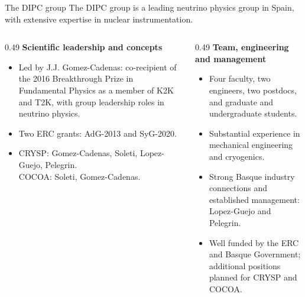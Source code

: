 \documentclass[aspectratio=169,11pt]{beamer}
\newcommand{\hi}[1]{\textcolor{crRed}{#1}}
\begin{document}


\begin{frame}{The DIPC group}
\small
The DIPC group is a leading neutrino physics group in Spain, with extensive expertise in \hi{nuclear instrumentation}.
\par\vspace{2mm}
\begin{columns}[T,onlytextwidth]
\begin{column}{0.49\textwidth}
\textbf{Scientific leadership and concepts}
\begin{itemize}
\item Led by \hi{J.J. Gomez-Cadenas}: co-recipient of the \hi{2016 Breakthrough Prize in Fundamental Physics} as a member of K2K and T2K, with group leadership roles in neutrino physics.
\item Two ERC grants: \hi{AdG-2013 and SyG-2020}.
\item \hi{CRYSP}: Gomez-Cadenas, Soleti, Lopez-Guejo, Pelegrin.\\
\hi{COCOA}: Soleti, Gomez-Cadenas.
\end{itemize}
\end{column}
\begin{column}{0.49\textwidth}
\textbf{Team, engineering and management}
\begin{itemize}
\item Four faculty, two engineers, two postdocs, and graduate and undergraduate students.
\item Substantial experience in mechanical engineering and cryogenics.
\item Strong Basque industry connections and established management: Lopez-Guejo and Pelegrin.
\item Well funded by the ERC and Basque Government; additional positions planned for CRYSP and COCOA.
\end{itemize}
\end{column}
\end{columns}
\end{frame}
\end{document}
